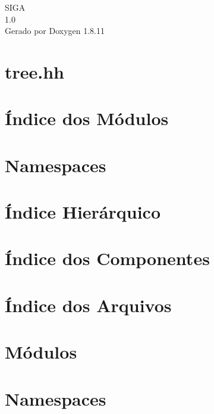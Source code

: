 \documentclass[twoside]{book}
\newcommand{\+}{\discretionary{\mbox{\scriptsize$\hookleftarrow$}}{}{}}
\newcommand{\clearemptydoublepage}{%
  \newpage{\pagestyle{empty}\cleardoublepage}%
}
\begin{document}
\begin{titlepage}
\vspace*{7cm}
\begin{center}%
{\Large S\+I\+GA \\[1ex]\large 1.\+0 }\\
\vspace*{1cm}
{\large Gerado por Doxygen 1.8.11}\\
\end{center}
\end{titlepage}
\clearemptydoublepage
\tableofcontents
\clearemptydoublepage
{}

\chapter{tree.\+hh}
\label{index}
\chapter{Índice dos Módulos}

\chapter{Namespaces}

\chapter{Índice Hierárquico}

\chapter{Índice dos Componentes}

\chapter{Índice dos Arquivos}

\chapter{Módulos}







\chapter{Namespaces}









\end{document}
